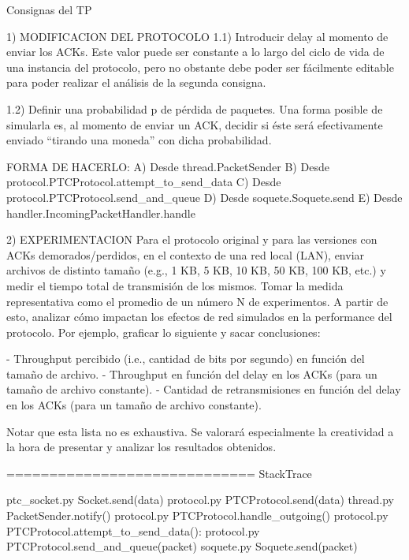 Consignas del TP

1) MODIFICACION DEL PROTOCOLO
	1.1) Introducir delay al momento de enviar los ACKs. Este valor puede ser constante a lo largo del ciclo de vida de una instancia del protocolo, pero no obstante debe poder ser fácilmente editable para poder realizar el análisis de la segunda consigna.

	1.2) Definir una probabilidad p de pérdida de paquetes. Una forma posible de simularla es, al momento de enviar un ACK, decidir si éste será efectivamente enviado “tirando una moneda” con dicha probabilidad.

FORMA DE HACERLO: 
	A) Desde thread.PacketSender
	B) Desde protocol.PTCProtocol.attempt_to_send_data
	C) Desde protocol.PTCProtocol.send_and_queue
	D) Desde soquete.Soquete.send
	E) Desde handler.IncomingPacketHandler.handle


2) EXPERIMENTACION
Para el protocolo original y para las versiones con ACKs demorados/perdidos, en el contexto de una red local (LAN), enviar archivos de distinto tamaño (e.g., 1 KB, 5 KB, 10 KB, 50 KB, 100 KB, etc.) y medir el tiempo total de transmisión de los mismos. Tomar la medida representativa como el promedio de un número N de experimentos. A partir de esto, analizar cómo impactan los efectos de red simulados en la performance del protocolo. Por ejemplo, graficar lo siguiente y sacar conclusiones: 

	- Throughput percibido (i.e., cantidad de bits por segundo) en función del tamaño de archivo.
	- Throughput en función del delay en los ACKs (para un tamaño de archivo constante).
	- Cantidad de retransmisiones en función del delay en los ACKs (para un tamaño de archivo constante).

Notar que esta lista no es exhaustiva. Se valorará especialmente la creatividad a la hora de presentar y
analizar los resultados obtenidos.




=============================
StackTrace

ptc_socket.py 	Socket.send(data)
protocol.py 	PTCProtocol.send(data)
thread.py		PacketSender.notify()
protocol.py 	PTCProtocol.handle_outgoing()
protocol.py		PTCProtocol.attempt_to_send_data():
protocol.py 	PTCProtocol.send_and_queue(packet)
soquete.py 		Soquete.send(packet)
